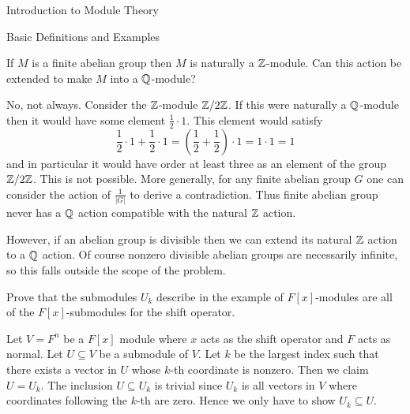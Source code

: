 \begin{chapter}{Introduction to Module Theory}
\begin{section}{Basic Definitions and Examples}
\begin{problem}\label{ex:10.1.15}
If $M$ is a finite abelian group then $M$ is naturally a $\mathbb{Z}$-module. Can this action be extended to make $M$ into a $\mathbb{Q}$-module?
\end{problem}
\begin{solution}
No, not always. Consider the $\mathbb{Z}$-module $\mathbb{Z}/2\mathbb{Z}$. If this were naturally a $\mathbb{Q}$-module then it would have some element $\frac{1}{2}\cdot 1$. This element would satisfy \[
\frac{1}{2}\cdot 1 + \frac{1}{2}\cdot 1 =\left(\frac{1}{2}+\frac{1}{2}\right)\cdot 1 = 1\cdot 1 = 1
\]
and in particular it would have order at least three as an element of the group $\mathbb{Z}/2\mathbb{Z}$. This is not possible. More generally, for any finite abelian group $G$ one can consider the action of $\frac{1}{|G|}$ to derive a contradiction. Thus finite abelian group never has a $\mathbb{Q}$ action compatible with the natural $\mathbb{Z}$ action. 

  However, if an abelian group is divisible then we can extend its natural $\mathbb{Z}$ action to a $\mathbb{Q}$ action. Of course nonzero divisible abelian groups are necessarily infinite, so this falls outside the scope of the problem.
\end{solution}\oneperpage



\begin{problem}\label{ex:10.1.16}
Prove that the submodules $U_k$ describe in the example of $F[x]$-modules are all of the $F[x]$-submodules for the shift operator.
\end{problem}
\begin{solution}
Let $V = F^n$ be a $F[x]$ module where $x$ acts as the shift operator and $F$ acts as normal. Let $U\subseteq V$ be a submodule of $V$. Let $k$ be the largest index such that there exists a vector in $U$ whose $k$-th coordinate is nonzero. Then we claim $U = U_k$. The inclusion $U\subseteq U_k$ is trivial since $U_k$ is all vectors in $V$ where coordinates following the $k$-th are zero. Hence we only have to show $U_k\subseteq U$. 


\end{solution}
\end{section}
\end{chapter}
